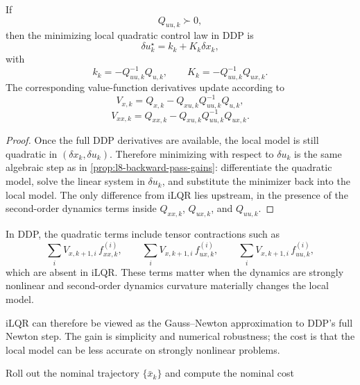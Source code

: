 \begin{proposition}\label{prop:l8-ddp-backward-pass-update}
	If
	\[
		Q_{uu,k}\succ 0,
	\]
	then the minimizing local quadratic control law in DDP is
	\[
		\delta u_k^\star = k_k + K_k \delta x_k,
	\]
	with
	\[
		k_k = -Q_{uu,k}^{-1}Q_{u,k},
		\qquad
		K_k = -Q_{uu,k}^{-1}Q_{ux,k}.
	\]
	The corresponding value-function derivatives update according to
	\[
		V_{x,k}=Q_{x,k}-Q_{xu,k}Q_{uu,k}^{-1}Q_{u,k},
	\]
	\[
		V_{xx,k}=Q_{xx,k}-Q_{xu,k}Q_{uu,k}^{-1}Q_{ux,k}.
	\]
\end{proposition}
\begin{proof}
	Once the full DDP derivatives are available, the local model is still quadratic in $(\delta x_k,\delta u_k)$. Therefore minimizing with respect to $\delta u_k$ is the same algebraic step as in \autoref{prop:l8-backward-pass-gains}: differentiate the quadratic model, solve the linear system in $\delta u_k$, and substitute the minimizer back into the local model. The only difference from iLQR lies upstream, in the presence of the second-order dynamics terms inside $Q_{xx,k}$, $Q_{ux,k}$, and $Q_{uu,k}$.
\end{proof}

\begin{remark}
	In DDP, the quadratic terms include tensor contractions such as
	\[
		\sum_i V_{x,k+1,i}\,f_{xx,k}^{(i)},
		\qquad
		\sum_i V_{x,k+1,i}\,f_{ux,k}^{(i)},
		\qquad
		\sum_i V_{x,k+1,i}\,f_{uu,k}^{(i)},
	\]
	which are absent in iLQR. These terms matter when the dynamics are strongly nonlinear and second-order dynamics curvature materially changes the local model.
\end{remark}

\begin{remark}
	iLQR can therefore be viewed as the Gauss--Newton approximation to DDP's full Newton step. The gain is simplicity and numerical robustness; the cost is that the local model can be less accurate on strongly nonlinear problems.
\end{remark}

\begin{algorithm}[H]
	\DontPrintSemicolon
	\caption{Differential Dynamic Programming}
\label{alg:l8-ddp}
	Roll out the nominal trajectory $\{\bar x_k\}$ and compute the nominal cost\;
\end{algorithm}

